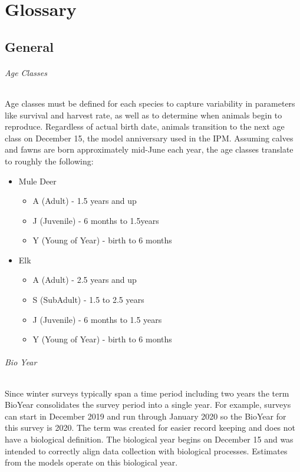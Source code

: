\documentclass[
]{book}
\providecommand{\tightlist}{%
  \setlength{\itemsep}{0pt}\setlength{\parskip}{0pt}}
\begin{document}
\hypertarget{gl}{%
\chapter{Glossary}\label{gl}}

\hypertarget{gl-general}{%
\section{General}\label{gl-general}}

\hypertarget{gl-age-classes}{%
\subparagraph*{Age Classes}\label{gl-age-classes}}

Age classes must be defined for each species to capture variability in parameters like survival and harvest rate, as well as to determine when animals begin to reproduce. Regardless of actual birth date, animals transition to the next age class on December 15, the model anniversary used in the IPM. Assuming calves and fawns are born approximately mid-June each year, the age classes translate to roughly the following:

\begin{itemize}
\tightlist
\item
  Mule Deer

  \begin{itemize}
  \tightlist
  \item
    A (Adult) - 1.5 years and up
  \item
    J (Juvenile) - 6 months to 1.5years
  \item
    Y (Young of Year) - birth to 6 months
  \end{itemize}
\item
  Elk

  \begin{itemize}
  \tightlist
  \item
    A (Adult) - 2.5 years and up
  \item
    S (SubAdult) - 1.5 to 2.5 years
  \item
    J (Juvenile) - 6 months to 1.5 years
  \item
    Y (Young of Year) - birth to 6 months
  \end{itemize}
\end{itemize}

\hypertarget{gl-bio-year}{%
\subparagraph*{Bio Year}\label{gl-bio-year}}

Since winter surveys typically span a time period including two years the term BioYear consolidates the survey period into a single year. For example, surveys can start in December 2019 and run through January 2020 so the BioYear for this survey is 2020. The term was created for easier record keeping and does not have a biological definition. The biological year begins on December 15 and was intended to correctly align data collection with biological processes. Estimates from the models operate on this biological year.
\end{document}

